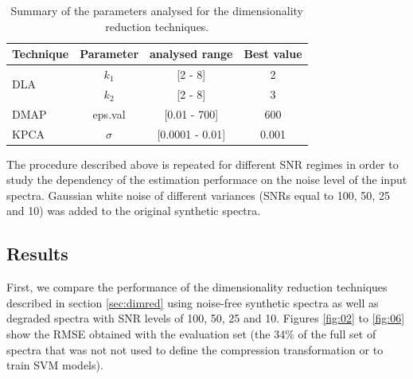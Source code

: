 \documentclass[a4paper,fleqn,usenatbib]{mnras}
\begin{document}
{{{\begin{table}
\centering
\caption{Summary of the parameters analysed for the 
dimensionality reduction techniques.}
\label{tab:parameters}
\begin{tabular}{l c c c}
\hline
\textbf{Technique} & \textbf{Parameter} & \textbf{analysed range} & \textbf{Best value} \\
\hline
\multirow{2}{*}{DLA} 
	& $k_1$ & [2 - 8]  & 2 \\\cline{2-4}
	& $k_2$ & [2 - 8]  & 3 \\\hline
DMAP & eps.val & [0.01 - 700] & 600 \\\hline
KPCA & $\sigma$ & [0.0001 - 0.01] & 0.001 \\
\hline
\end{tabular}
\end{table}

The procedure described above is repeated for different SNR regimes in
order to study the dependency of the estimation performace on the
noise level of the input spectra. Gaussian white noise of different
variances (SNRs equal to 100, 50, 25 and 10) was added to the original
synthetic spectra. 

\subsection{Results}

First, we compare the performance of the dimensionality reduction
techniques described in section \ref{sec:dimred} using noise-free
synthetic spectra as well as degraded spectra with SNR levels of 100,
50, 25 and 10.  Figures \ref{fig:02} to \ref{fig:06} show the RMSE
obtained with the evaluation set (the 34\% of the full set of spectra
that was not not used to define the compression transformation or to
train SVM models).

}}}
\end{document}
